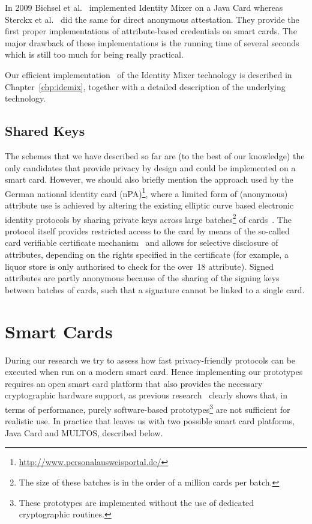 In 2009 Bichsel et al.~\cite{BichselCGS2009} implemented Identity Mixer
 on a Java Card whereas Sterckx et
al.~\cite{Sterckx09} did the same for direct anonymous attestation. They provide the first proper implementations of
attribute-based credentials on smart cards. The major drawback of these
implementations is the running time of several seconds which is still too much
for being really practical.

Our efficient implementation~\cite{VullersAlpar2013} of the Identity Mixer
 technology is described in Chapter~\ref{chp:idemix},
together with a detailed description of the underlying technology.

\subsection{Shared Keys\label{sec:nPA}}

The schemes that we have described so far are (to the best of our knowledge) the
only candidates that provide privacy by design and could be implemented on a
smart card. However, we should also briefly mention the approach used by
the German national identity card (nPA)\footnote{%
\url{http://www.personalausweisportal.de/}}, where a limited form of (anonymous)
 attribute use is achieved by altering the existing
elliptic curve based electronic identity protocols by sharing private keys
 across large batches\footnote{The size of these batches is in the order of a million cards per batch.} of cards~\cite{Kugler2010}. The
protocol itself provides restricted access to the card by means of the so-called
card verifiable certificate mechanism~\cite{EAC20} and allows for selective
disclosure of attributes, depending on the rights specified in the certificate
(for example, a liquor store is only authorised to check
for the \textsf{over~18} attribute). Signed attributes are partly anonymous
 because of the sharing of the signing keys between
batches of cards, such that a signature cannot be linked to a single card.

\section{Smart Cards\label{sec:smartcards}}

During our research we try to assess how fast privacy-friendly protocols can be
executed when run on a modern smart card. Hence
implementing our prototypes requires an open smart card platform that also provides the necessary cryptographic hardware support,
as previous research~\cite{TewsJacobs09} clearly shows that, in terms of
performance, purely software-based prototypes\footnote{These prototypes are 
implemented without the use of dedicated cryptographic routines.} are not 
sufficient for realistic use. In practice that leaves us with two possible 
smart card platforms, Java Card and MULTOS, 
described below.

